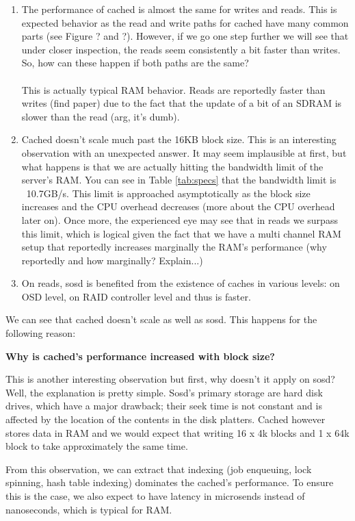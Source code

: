 \begin{enumerate}
	\item The performance of cached is almost the same for writes and reads.  
		This is expected behavior as the read and write paths for cached have 
		many common parts (see Figure ? and ?). However, if we go one step 
		further we will see that under closer inspection, the reads seem 
		consistently a bit faster than writes. So, how can these happen if both 
		paths are the same? \\
		\\
		This is actually typical RAM behavior. Reads are reportedly faster than 
		writes (find paper) due to the fact that the update of a bit of an 
		SDRAM is slower than the read (arg, it's dumb).
	\item Cached doesn't scale much past the 16KB block size. This is an 
		interesting observation with an unexpected answer. It may seem 
		implausible at first, but what happens is that we are actually hitting 
		the bandwidth limit of the server's RAM. You can see in Table 
		\ref{tab:specs} that the bandwidth limit is ~10.7GB/s. This limit is 
		approached asymptotically as the block size increases and the CPU 
		overhead decreases (more about the CPU overhead later on). Once more, 
		the experienced eye may see that in reads we surpass this limit, which 
		is logical given the fact that we have a multi channel RAM setup that 
		reportedly increases marginally the RAM's performance (why reportedly 
		and how marginally? Explain...)
	\item On reads, sosd is benefited from the existence of caches in various 
		levels: on OSD level, on RAID controller level and thus is faster.
\end{enumerate}


We can see that cached doesn't scale as well as sosd. This happens for the 
following reason:

\textbf{Why is cached's performance increased with block size?}

This is another interesting observation but first, why doesn't it apply on 
sosd? Well, the explanation is pretty simple. Sosd's primary storage are hard 
disk drives, which have a major drawback; their seek time is not constant and 
is affected by the location of the contents in the disk platters. Cached 
however stores data in RAM and we would expect that writing 16 x 4k blocks and 
1 x 64k block to take approximately the same time.

From this observation, we can extract that indexing (job enqueuing, lock 
spinning, hash table indexing) dominates the cached's performance. To ensure 
this is the case, we also expect to have latency in microsends instead of 
nanoseconds, which is typical for RAM.
